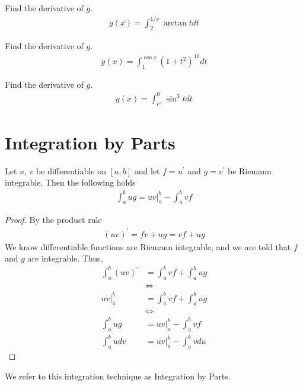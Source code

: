 \begin{exercise}
Find the derivative of $g$.
\begin{align*}
    g(x) = \int_{2}^{1/x} \arctan t dt
\end{align*}
\end{exercise}

\begin{exercise}
Find the derivative of $g$.
\begin{align*}
    g(x) = \int_{1}^{\cos x} (1 + t^{2})^{10} dt
\end{align*}
\end{exercise}

\begin{exercise}
Find the derivative of $g$.
\begin{align*}
    g(x) = \int_{e^{x}}^{0} \sin^{3} t dt
\end{align*}
\end{exercise}

\newpage
\section{Integration by Parts}

\begin{theorem}
Let $u$, $v$ be differentiable on $[a, b]$ and let $f = u^{'}$ and $g = v^{'}$ be Riemann integrable. Then the following holds
\begin{align*}
    \int_{a}^{b} ug = uv \Big|_{a}^{b} - \int_{a}^{b} vf
\end{align*}
\begin{proof}
By the product rule
\begin{align*}
    (uv)^{'} = fv + ug = vf + ug
\end{align*}
We know differentiable functions are Riemann integrable, and we are told that $f$ and $g$ are integrable. Thus,
\begin{align*}
    \int_{a}^{b} (uv)^{'} &= \int_{a}^{b} vf + \int_{a}^{b} ug\\[2ex]
    &\Longleftrightarrow\\[2ex]
    uv \Big|_{a}^{b} &= \int_{a}^{b} vf + \int_{a}^{b} ug\\[2ex] 
    &\Longleftrightarrow\\[2ex]
    \int_{a}^{b} ug &= uv \Big|_{a}^{b} - \int_{a}^{b} vf\\[2ex]
    \int_{a}^{b} u dv &= uv \Big|_{a}^{b} - \int_{a}^{b} v du
\end{align*}
\end{proof}
We refer to this integration technique as Integration by Parts.
\end{theorem}